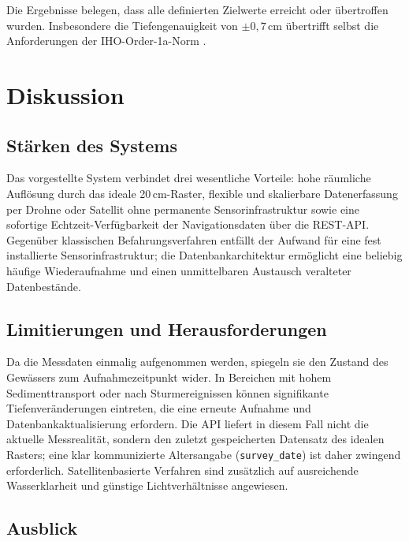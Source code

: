﻿\documentclass[a4paper,12pt]{article}
\theoremstyle{definition}
\begin{document}
\noindent
Die Ergebnisse belegen, dass alle definierten Zielwerte erreicht oder übertroffen wurden.
Insbesondere die Tiefengenauigkeit von $\pm 0{,}7\,\text{cm}$ übertrifft selbst die
Anforderungen der IHO-Order-1a-Norm \cite{iho2020}.

\section{Diskussion}

\subsection{Stärken des Systems}

Das vorgestellte System verbindet drei wesentliche Vorteile: hohe räumliche Auflösung
durch das ideale 20\,cm-Raster, flexible und skalierbare Datenerfassung per Drohne oder
Satellit ohne permanente Sensorinfrastruktur sowie eine sofortige Echtzeit-Verfügbarkeit
der Navigationsdaten über die REST-API. Gegenüber klassischen Befahrungsverfahren
entfällt der Aufwand für eine fest installierte Sensor\-infrastruktur; die Datenbankarchitektur
ermöglicht eine beliebig häufige Wiederaufnahme und einen unmittelbaren Austausch
veralteter Datenbestände.

\subsection{Limitierungen und Herausforderungen}

Da die Messdaten einmalig aufgenommen werden, spiegeln sie den Zustand des Gewässers
zum Aufnahmezeitpunkt wider. In Bereichen mit hohem Sedimenttransport oder nach
Sturmereignissen können signifikante Tiefenveränderungen eintreten, die eine erneute
Aufnahme und Datenbankaktualisierung erfordern. Die API liefert in diesem Fall nicht
die aktuelle Messrealität, sondern den zuletzt gespeicherten Datensatz des idealen
Rasters; eine klar kommunizierte Altersangabe (\texttt{survey\_date}) ist daher
zwingend erforderlich. Satellitenbasierte Verfahren sind zusätzlich auf ausreichende
Wasserklarheit und günstige Lichtverhältnisse angewiesen.

\subsection{Ausblick}
\end{document}
